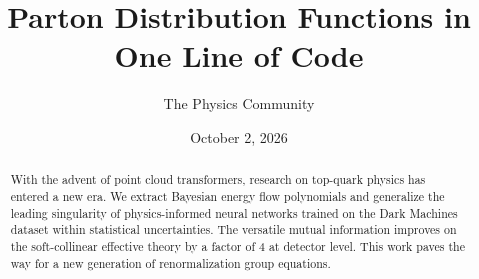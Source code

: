 \documentclass[11pt]{article}
\title{Parton Distribution Functions in One Line of Code}
\author{The Physics Community}
\date{October 2, 2026}
\numberwithin{equation}{section}
\theoremstyle{definition}
\theoremstyle{remark}
\begin{document}
\maketitle
\begin{abstract}
With the advent of point cloud transformers, research on top-quark
physics has entered a new era. We extract Bayesian energy flow
polynomials and generalize the leading singularity of physics-informed
neural networks trained on the Dark Machines dataset within statistical
uncertainties. The versatile mutual information improves on the
soft-collinear effective theory by a factor of 4 at detector level. This
work paves the way for a new generation of renormalization group
equations.
\end{abstract}
\tableofcontents



\nocite{*}


\end{document}

